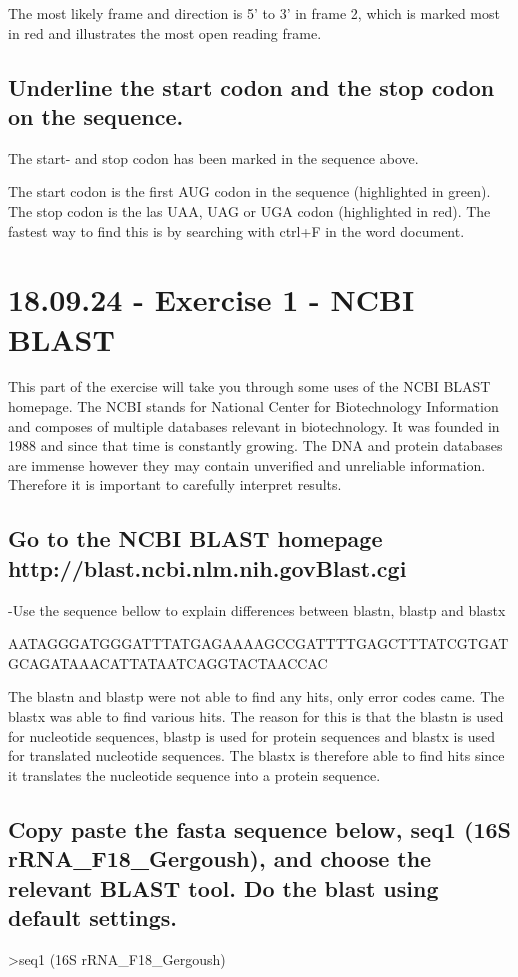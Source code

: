 The most likely frame and direction is 5' to 3' in frame 2, which is marked most in red and illustrates the most open reading frame.

\subsection*{Underline the start codon and the stop codon on the sequence.}
The start- and stop codon has been marked in the sequence above. 

The start codon is the first AUG codon in the sequence (highlighted in green). The stop codon is the las UAA, UAG or UGA codon (highlighted in red). The fastest way to find this is by searching with ctrl+F in the word document. 

\section{18.09.24 - Exercise 1 - NCBI BLAST}
This part of the exercise will take you through some uses of the NCBI BLAST homepage. The NCBI stands for National Center for Biotechnology Information and composes of multiple databases relevant in biotechnology. It was founded in 1988 and since that time is constantly growing. The DNA and protein databases are immense however they may contain unverified and unreliable information. Therefore it is important to carefully interpret results.

\subsection*{Go to the NCBI BLAST homepage http://blast.ncbi.nlm.nih.govBlast.cgi}
-Use the sequence bellow to explain differences between blastn, blastp and blastx

AATAGGGATGGGATTTATGAGAAAAGCCGATTTTGAGCTTTATCGTGATGCAGATAAACATTATAATCAGGTACTAACCAC


The blastn and blastp were not able to find any hits, only error codes came. The blastx was able to find various hits. The reason for this is that the blastn is used for nucleotide sequences, blastp is used for protein sequences and blastx is used for translated nucleotide sequences. The blastx is therefore able to find hits since it translates the nucleotide sequence into a protein sequence.

\subsection*{Copy paste the fasta sequence below, seq1 (16S rRNA\_F18\_Gergoush), and choose the relevant BLAST tool. Do the blast using default settings.}
>seq1 (16S rRNA\_F18\_Gergoush)

